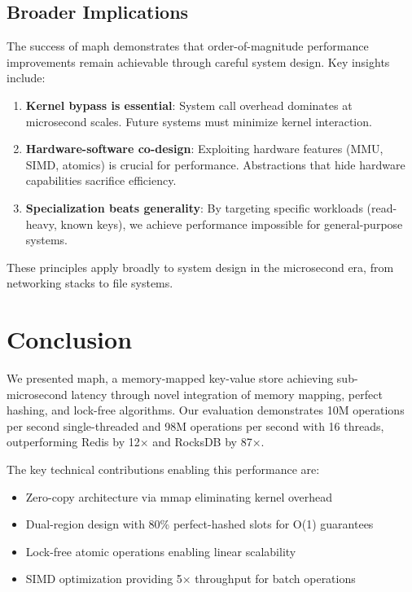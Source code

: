 \documentclass[10pt,conference]{IEEEtran}
\begin{document}
\subsection{Broader Implications}

The success of maph demonstrates that order-of-magnitude performance improvements remain achievable through careful system design. Key insights include:

\begin{enumerate}
\item \textbf{Kernel bypass is essential}: System call overhead dominates at microsecond scales. Future systems must minimize kernel interaction.

\item \textbf{Hardware-software co-design}: Exploiting hardware features (MMU, SIMD, atomics) is crucial for performance. Abstractions that hide hardware capabilities sacrifice efficiency.

\item \textbf{Specialization beats generality}: By targeting specific workloads (read-heavy, known keys), we achieve performance impossible for general-purpose systems.
\end{enumerate}

These principles apply broadly to system design in the microsecond era, from networking stacks to file systems.

\section{Conclusion}
\label{sec:conclusion}

We presented maph, a memory-mapped key-value store achieving sub-microsecond latency through novel integration of memory mapping, perfect hashing, and lock-free algorithms. Our evaluation demonstrates 10M operations per second single-threaded and 98M operations per second with 16 threads, outperforming Redis by 12× and RocksDB by 87×.

The key technical contributions enabling this performance are:
\begin{itemize}
\item Zero-copy architecture via mmap eliminating kernel overhead
\item Dual-region design with 80\% perfect-hashed slots for O(1) guarantees
\item Lock-free atomic operations enabling linear scalability
\item SIMD optimization providing 5× throughput for batch operations
\end{itemize}
\end{document}

